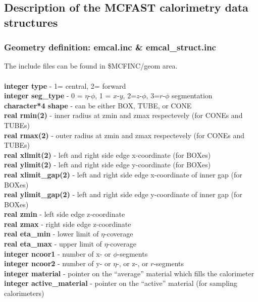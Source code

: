 \subsection{Description of the MCFAST calorimetry data structures}

\subsubsection{Geometry definition: {\bf emcal.inc \& emcal\_struct.inc}}

The include files can be found in \$MCFINC/geom area. \\
\\
{\bf integer type} - 1= central, 2= forward \\
{\bf integer seg\_type} - 0 = $\eta$-$\phi$, 1 = $x$-$y$, 2=$z$-$\phi$, 3=$r$-$\phi$ segmentation \\
{\bf character*4 shape} - can be either BOX, TUBE, or CONE \\
{\bf real rmin(2)} - inner radius at zmin and zmax respectevely 
(for CONEs and TUBEs) \\
{\bf real rmax(2)} - outer radius at zmin and zmax respectevely 
(for CONEs and TUBEs)\\
{\bf real xlimit(2)} - left and right side edge x-coordinate (for BOXes) \\
{\bf real ylimit(2)} - left and right side edge y-coordinate (for BOXes) \\
{\bf real xlimit\_gap(2)} - left and right side edge x-coordinate of inner gap
(for BOXes) \\
{\bf real ylimit\_gap(2)} - left and right side edge y-coordinate of inner gap
(for BOXes) \\
{\bf real zmin} - left side edge z-coordinate  \\
{\bf real zmax} - right side edge z-coordinate \\
{\bf real eta\_min} - lower limit of $\eta$-coverage \\
{\bf real eta\_max} - upper limit of $\eta$-coverage \\
{\bf integer ncoor1} - number of x- or $\phi$-segments \\
{\bf integer ncoor2} - number of y- or $\eta$-, or z-, or $r$-segments \\
{\bf integer material} - pointer on the ``average'' material which fills 
the calorimeter \\
{\bf integer active\_material} - pointer on the ``active'' material (for sampling
calorimeters) \\
